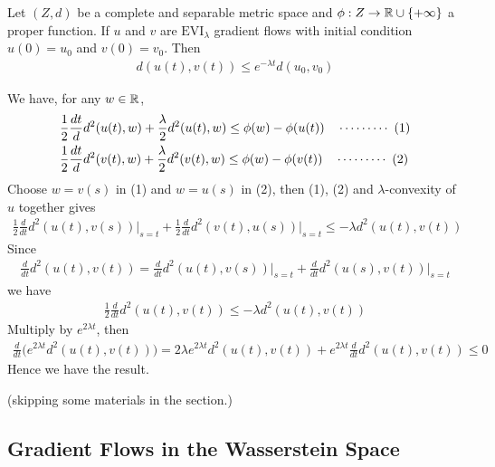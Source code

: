 \documentclass[12pt,a4paper]{article}
\newenvironment{proof}
{\begin{changemargin}{1cm}{0.5cm} 
	}%
	{\end{changemargin}
}
\newenvironment{p}
{\begin{proof} 
	}%
	{\end{proof}
}
\begin{document}
 Let $(Z,d)$ be a complete and separable metric space and $\phi : Z\rightarrow \mathbb{R} \cup \{+ \infty \}$ a proper function. If $u$ and $v$ are $\text{EVI}_{\lambda}$ gradient flows with initial condition $u(0) = u_0$ and $v(0) = v_0$. Then
\begin{align*}
d(u(t), v(t)) \leq e^{-\lambda t} d(u_0, v_0)
\end{align*}
\begin{p}
\pf We have, for any $w\in \mathbb{R}$,
\begin{align*}
& \frac{1}{2} \frac{dt}{d} d^2(u(t), w) + \frac{\lambda}{2} d^2(u(t),w) \leq \phi(w) - \phi(u(t)) \quad \cdots\cdots\cdots\,\,(1)\\
& \frac{1}{2} \frac{dt}{d} d^2(v(t), w) + \frac{\lambda}{2} d^2(v(t),w) \leq \phi(w) - \phi(v(t)) \quad \cdots\cdots\cdots\,\,(2)
\end{align*}
Choose $w = v(s)$ in (1)  and $w= u(s)$ in (2), then (1), (2) and $\lambda$-convexity of $u$ together gives
\begin{align*}
\frac{1}{2} \frac{d}{dt} d^2(u(t), v(s))\Big|_{s=t} + \frac{1}{2}\frac{d}{dt} d^2 (v(t), u(s))\Big|_{s=t} \leq - \lambda d^2(u(t), v(t))
\end{align*}
Since
\begin{align*}
\frac{d}{dt} d^2(u(t), v(t)) = \frac{d}{dt} d^2(u(t), v(s)) \Big|_{s=t} + \frac{d}{dt} d^2(u(s), v(t)) \Big|_{s=t}
\end{align*}
we have
\begin{align*}
\frac{1}{2} \frac{d}{dt} d^2(u(t), v(t))\leq -\lambda d^2(u(t), v(t))
\end{align*}
Multiply by $e^{2\lambda t}$, then 
\begin{align*}
\frac{d}{dt} \big( e^{2\lambda t} d^2(u(t), v(t)) \big) = 2\lambda e^{2\lambda t} d^2(u(t), v(t)) + e^{2\lambda t} \frac{d}{dt} d^2(u(t), v(t)) \leq 0
\end{align*}
Hence we have the result.

\eop
\end{p}

(skipping some materials in the section.)

\subsection{Gradient Flows in the Wasserstein Space}
\end{document}
